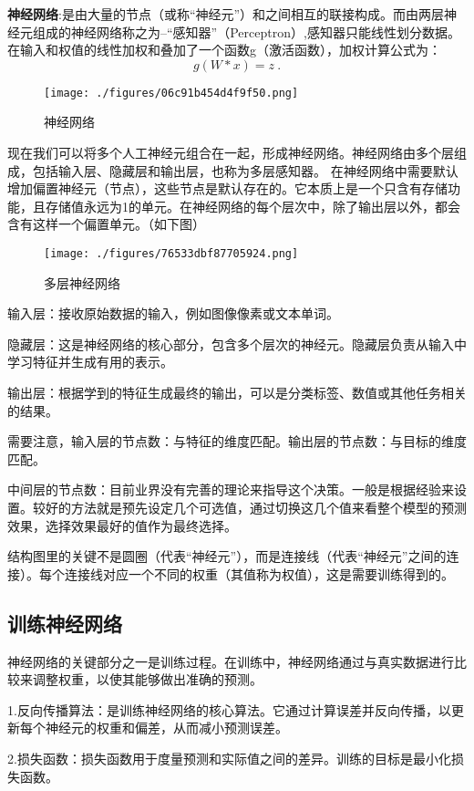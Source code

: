 \textbf{神经网络}:是由大量的节点（或称“神经元”）和之间相互的联接构成。而由两层神经元组成的神经网络称之为--“感知器”（Perceptron）,感知器只能线性划分数据。在输入和权值的线性加权和叠加了一个函数g（激活函数），加权计算公式为：
\begin{equation}
g(W * x) = z~.
\end{equation}
\begin{figure}[ht]
\centering
\texttt{[image: ./figures/06c91b454d4f9f50.png]}
\caption{神经网络} \label{fig_CNN1_4}
\end{figure}
现在我们可以将多个人工神经元组合在一起，形成神经网络。神经网络由多个层组成，包括输入层、隐藏层和输出层，也称为多层感知器。
在神经网络中需要默认增加偏置神经元（节点），这些节点是默认存在的。它本质上是一个只含有存储功能，且存储值永远为1的单元。在神经网络的每个层次中，除了输出层以外，都会含有这样一个偏置单元。（如下图）\begin{figure}[ht]
\centering
\texttt{[image: ./figures/76533dbf87705924.png]}
\caption{多层神经网络} \label{fig_CNN1_5}
\end{figure}
输入层：接收原始数据的输入，例如图像像素或文本单词。

隐藏层：这是神经网络的核心部分，包含多个层次的神经元。隐藏层负责从输入中学习特征并生成有用的表示。

输出层：根据学到的特征生成最终的输出，可以是分类标签、数值或其他任务相关的结果。

需要注意，输入层的节点数：与特征的维度匹配。输出层的节点数：与目标的维度匹配。

中间层的节点数：目前业界没有完善的理论来指导这个决策。一般是根据经验来设置。较好的方法就是预先设定几个可选值，通过切换这几个值来看整个模型的预测效果，选择效果最好的值作为最终选择。

结构图里的关键不是圆圈（代表“神经元”），而是连接线（代表“神经元”之间的连接）。每个连接线对应一个不同的权重（其值称为权值），这是需要训练得到的。
\subsection{训练神经网络}
神经网络的关键部分之一是训练过程。在训练中，神经网络通过与真实数据进行比较来调整权重，以使其能够做出准确的预测。

1.反向传播算法：是训练神经网络的核心算法。它通过计算误差并反向传播，以更新每个神经元的权重和偏差，从而减小预测误差。

2.损失函数：损失函数用于度量预测和实际值之间的差异。训练的目标是最小化损失函数。